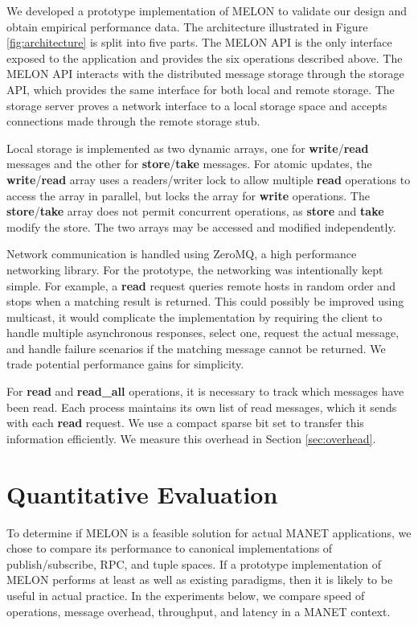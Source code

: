 \documentclass[lnicst]{svmultln}
\begin{document}
We developed a prototype implementation of MELON to validate our design and obtain empirical performance data. The architecture illustrated in Figure \ref{fig:architecture} is split into five parts. The MELON API is the only interface exposed to the application and provides the six operations described above. The MELON API interacts with the distributed message storage through the storage API, which provides the same interface for both local and remote storage. The storage server proves a network interface to a local storage space and accepts connections made through the remote storage stub.

Local storage is implemented as two dynamic arrays, one for \textbf{write}/\textbf{read} messages and the other for \textbf{store}/\textbf{take} messages. For atomic updates, the \textbf{write}/\textbf{read} array uses a readers/writer lock to allow multiple \textbf{read} operations to access the array in parallel, but locks the array for \textbf{write} operations. The \textbf{store}/\textbf{take} array does not permit concurrent operations, as \textbf{store} and \textbf{take} modify the store. The two arrays may be accessed and modified independently.

Network communication is handled using ZeroMQ\cite{hintjens2013zeromq}, a high performance networking library. For the prototype, the networking was intentionally kept simple. For example, a \textbf{read} request queries remote hosts in random order and stops when a matching result is returned. This could possibly be improved using multicast, it would complicate the implementation by requiring the client to handle multiple asynchronous responses, select one, request the actual message, and handle failure scenarios if the matching message cannot be returned. We trade potential performance gains for simplicity. 

For \textbf{read} and \textbf{read\_all} operations, it is necessary to track which messages have been read. Each process maintains its own list of read messages, which it sends with each \textbf{read} request. We use a compact sparse bit set to transfer this information efficiently. We measure this overhead in Section \ref{sec:overhead}.

\section{Quantitative Evaluation}\label{sec:evaluation}

To determine if MELON is a feasible solution for actual MANET applications, we chose to compare its performance to canonical implementations of publish/subscribe, RPC, and tuple spaces. If a prototype implementation of MELON performs at least as well as existing paradigms, then it is likely to be useful in actual practice. In the experiments below, we compare speed of operations, message overhead, throughput, and latency in a MANET context.
\end{document}
